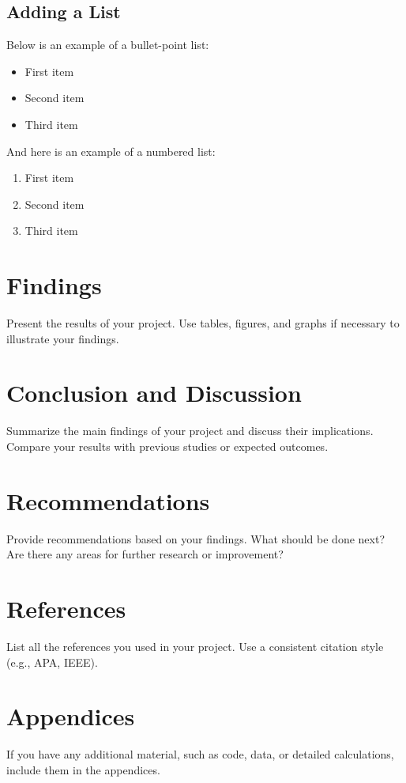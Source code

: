 \documentclass[12pt,a4paper]{article}
\begin{document}
	\subsection{Adding a List}
	Below is an example of a bullet-point list:
	
	\begin{itemize}
		\item First item
		\item Second item
		\item Third item
	\end{itemize}
	
	And here is an example of a numbered list:
	
	\begin{enumerate}
		\item First item
		\item Second item
		\item Third item
	\end{enumerate}
	
	\section{Findings}
	Present the results of your project. Use tables, figures, and graphs if necessary to illustrate your findings.
	
	\section{Conclusion and Discussion}
	Summarize the main findings of your project and discuss their implications. Compare your results with previous studies or expected outcomes.
	
	\section{Recommendations}
	Provide recommendations based on your findings. What should be done next? Are there any areas for further research or improvement?
	
	\section*{References}
	List all the references you used in your project. Use a consistent citation style (e.g., APA, IEEE).
	
	\section*{Appendices}
	If you have any additional material, such as code, data, or detailed calculations, include them in the appendices.
	
\end{document}

